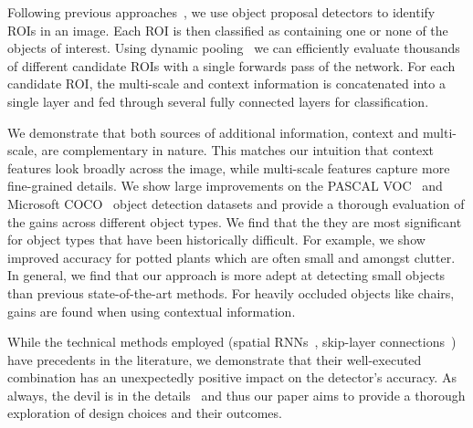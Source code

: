\documentclass[10pt,twocolumn,letterpaper]{article}
\begin{document}
Following previous approaches~\cite{girshick2014rcnn}, we use object proposal
detectors \cite{Hosang15proposals,UijlingsIJCV2013,edgeboxes} to identify ROIs in
an image. Each ROI is then classified as containing one or none of the objects of
interest. Using dynamic pooling~\cite{sppnet} we can efficiently evaluate
thousands of different candidate ROIs with a single forwards pass of the
network. For each candidate ROI, the multi-scale and context information is
concatenated into a single layer and fed through several fully connected layers
for classification.

We demonstrate that both sources of additional information, context and
multi-scale, are complementary in nature. This matches our intuition that
context features look broadly across the image, while multi-scale features
capture more fine-grained details. We show large improvements on the PASCAL
VOC~\cite{pascal} and Microsoft COCO~\cite{coco} object detection datasets and
provide a thorough evaluation of the gains across different object types.  We
find that the they are most significant for object types that have been
historically difficult. For example, we show improved accuracy for potted plants
which are often small and amongst clutter. In general, we find that our
approach is more adept at detecting small objects than previous
state-of-the-art methods.  For heavily occluded objects like chairs, gains are
found when using contextual information.

While the technical methods employed (spatial
RNNs~\cite{nd-rnn,sceneLSTM,renet}, skip-layer
connections~\cite{sermanetCVPR13,parsenet,fcn,hariharan2015hypercolumns}) have
precedents in the literature, we demonstrate that their well-executed
combination has an unexpectedly positive impact on the detector's accuracy.  As
always, the devil is in the details~\cite{Chatfield14} and thus our paper aims
to provide a thorough exploration of design choices and their
outcomes.
\end{document}
